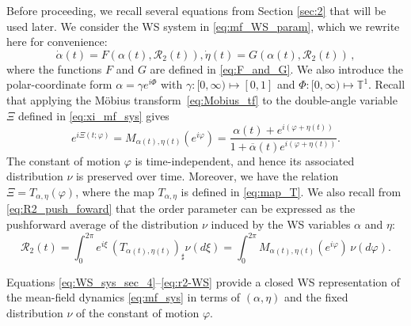 \documentclass[10pt]{article}
\theoremstyle{definition}
\theoremstyle{definition}
\numberwithin{equation}{section}
\newcommand{\BBT}{\mathbb{T}}
\newcommand{\CR}{\mathcal{R}}
\newcommand{\Dalpha}{\Dot{\alpha}}
\newcommand{\Deta}{\Dot{\eta}}
\begin{document}
Before proceeding, we recall several equations from Section \ref{sec:2} that will be used later.
We consider the WS system in \eqref{eq:mf_WS_param}, which we rewrite here for convenience:
\begin{subequations}\label{eq:WS_sys_sec_4}
\begin{equation}\label{eq:WSshort-a}
    \Dalpha(t) = F(\alpha(t), \CR_2(t)),
\end{equation}
\begin{equation}\label{eq:WSshort-b}
    \Deta(t) = G(\alpha(t), \CR_2(t)) \, ,
\end{equation}
\end{subequations}
where the functions $F$ and $G$ are defined in \eqref{eq:F_and_G}. We also introduce the polar-coordinate form $\alpha = \gamma e^{i\Phi}$ with $\gamma: [0,\infty) \mapsto [0,1]$ and $\Phi: [0,\infty) \mapsto \BBT^1 $.
Recall that applying the M\"obius transform~\eqref{eq:Mobius_tf} to the double-angle variable $\Xi$ defined in \eqref{eq:xi_mf_sys} gives
\begin{equation}\label{eq:WS-mobius}
e^{i\Xi(t;\varphi)} = M_{\alpha(t),\eta(t)} (e^{i\varphi}) = \frac{\alpha(t)+e^{i(\varphi+\eta(t))}}{1+\overline{\alpha}(t)e^{i(\varphi+\eta(t))}}.
\end{equation}
The constant of motion $\varphi$ is time-independent, and hence its associated distribution $\nu$ is preserved over time. 
Moreover, we have the relation $\Xi = T_{\alpha, \eta} (\varphi)$, where the map $T_{\alpha, \eta}$ is defined in \eqref{eq:map_T}. 
We also recall from \eqref{eq:R2_push_foward} that the 
order parameter can be expressed as the pushforward average of the distribution $\nu$ induced by the WS variables $\alpha$ and $\eta$:
\begin{equation}\label{eq:r2-WS}
\CR_2(t)=\int_0^{2\pi} e^{i\xi}\,(T_{\alpha(t), \eta(t)})_{\sharp} \nu (d\xi)
= \int_0^{2\pi} M_{\alpha(t), \eta(t)} (e^{i\varphi}) \,\nu (d\varphi).
\end{equation}

Equations \eqref{eq:WS_sys_sec_4}--\eqref{eq:r2-WS} provide a closed WS representation of the mean-field dynamics \eqref{eq:mf_sys} in terms of $(\alpha,\eta)$ and the fixed distribution $\nu$ of the constant of motion $\varphi$.
\end{document}
